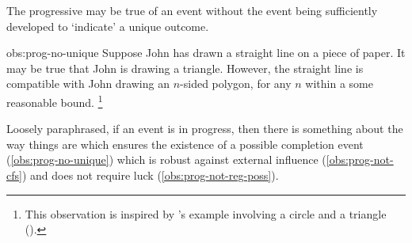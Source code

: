 \begin{note}
  \begin{observation}%
    \label{obs:prog-no-unique}%
    The progressive may be true of an event without the event being sufficiently developed to `indicate' a unique outcome.
  \end{observation}
  \begin{motivation}{obs:prog-no-unique}
    Suppose John has drawn a straight line on a piece of paper.
    It may be true that John is drawing a triangle.
    However, the straight line is compatible with John drawing an \(n\)-sided polygon, for any \(n\) within a some reasonable bound.%
    \footnote{
      This observation is inspired by \citeauthor{Dowty:1979vq}'s example involving a circle and a triangle (\citeyear[133]{Dowty:1979vq}).
    }
  \end{motivation}
\end{note}

\begin{note}
  Loosely paraphrased, if an event is in progress, then there is something about the way things are which ensures the existence of a possible completion event (\autoref{obs:prog-no-unique}) which is robust against external influence (\autoref{obs:prog-not-cfs}) and does not require luck (\autoref{obs:prog-not-reg-poss}).
\end{note}

